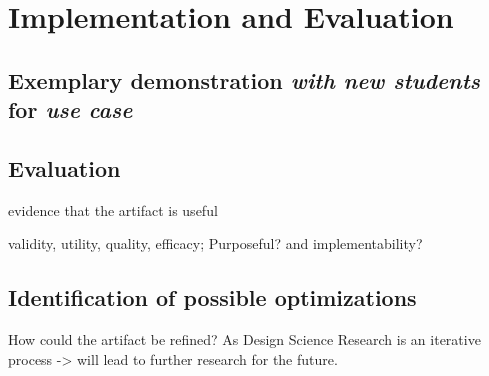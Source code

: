 \chapter{Implementation and Evaluation}

\section{Exemplary demonstration \textit{with new students} for \textit{use case}} \label{sec:demo}

\section{Evaluation}

evidence that the artifact is useful

validity, utility, quality, efficacy; Purposeful? and implementability?

\section{Identification of possible optimizations} \label{sec:Optimizations}

How could the artifact be refined? As Design Science Research is an iterative process -> will lead to further research for the future.
